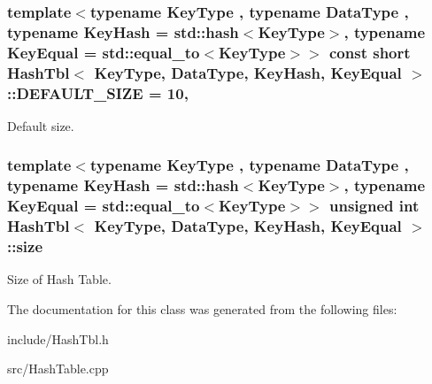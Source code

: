 \subsubsection[{D\+E\+F\+A\+U\+L\+T\+\_\+\+S\+I\+ZE}]{\setlength{\rightskip}{0pt plus 5cm}template$<$typename Key\+Type , typename Data\+Type , typename Key\+Hash  = std\+::hash$<$\+Key\+Type$>$, typename Key\+Equal  = std\+::equal\+\_\+to$<$\+Key\+Type$>$$>$ const short {\bf Hash\+Tbl}$<$ Key\+Type, Data\+Type, Key\+Hash, Key\+Equal $>$\+::D\+E\+F\+A\+U\+L\+T\+\_\+\+S\+I\+ZE = 10\hspace{0.3cm}{\ttfamily [static]}, {\ttfamily [private]}}\hypertarget{classHashTbl_aeffa5b1a163fb6a09a18fd254a4d6dcf}{}\label{classHashTbl_aeffa5b1a163fb6a09a18fd254a4d6dcf}
Default size. 
\subsubsection[{size}]{\setlength{\rightskip}{0pt plus 5cm}template$<$typename Key\+Type , typename Data\+Type , typename Key\+Hash  = std\+::hash$<$\+Key\+Type$>$, typename Key\+Equal  = std\+::equal\+\_\+to$<$\+Key\+Type$>$$>$ unsigned int {\bf Hash\+Tbl}$<$ Key\+Type, Data\+Type, Key\+Hash, Key\+Equal $>$\+::size\hspace{0.3cm}{\ttfamily [private]}}\hypertarget{classHashTbl_a6335ac2d69675a22061cb6fde504f21c}{}\label{classHashTbl_a6335ac2d69675a22061cb6fde504f21c}
Size of Hash Table. 

The documentation for this class was generated from the following files\+:\begin{DoxyCompactItemize}
\item 
include/Hash\+Tbl.\+h\item 
src/Hash\+Table.\+cpp\end{DoxyCompactItemize}
